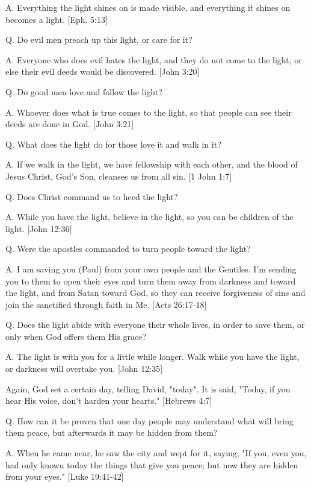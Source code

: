 \documentclass[../main.tex]{subfiles}
\begin{document}
	A. Everything the light shines on is made visible, and everything it shines on becomes a light. [Eph. 5:13]

	Q. Do evil men preach up this light, or care for it?

	A. Everyone who does evil hates the light, and they do not come to the light, or else their evil deeds would be discovered. [John 3:20]

	Q. Do good men love and follow the light?

	A. Whoever does what is true comes to the light, so that people can see their deeds are done in God. [John 3:21]

	Q. What does the light do for those love it and walk in it?

	A. If we walk in the light, we have fellowship with each other, and the blood of Jesus Christ, God's Son, cleanses us from all sin. [1 John 1:7]

	Q. Does Christ command us to heed the light?

	A. While you have the light, believe in the light, so you can be children of the light. [John 12:36]

	Q. Were the apostles commanded to turn people toward the light?

	A. I am saving you (Paul) from your own people and the Gentiles.  I'm sending you to them to open their eyes and turn them away from darkness and toward the light, and from Satan toward God, so they can receive forgiveness of sins and join the sanctified through faith in Me. [Acts 26:17-18]

	Q. Does the light abide with everyone their whole lives, in order to save them, or only when God offers them His grace?

	A. The light is with you for a little while longer. Walk while you have the light, or darkness will overtake you. [John 12:35]

	Again, God set a certain day, telling David, "today". It is said, "Today, if you hear His voice, don't harden your hearts." [Hebrews 4:7]

	Q. How can it be proven that one day people may understand what will bring them peace, but afterwards it may be hidden from them?

	A. When he came near, he saw the city and wept for it, saying, "If you, even you, had only known today the things that give you peace; but now they are hidden from your eyes." [Luke 19:41-42]
\end{document}
